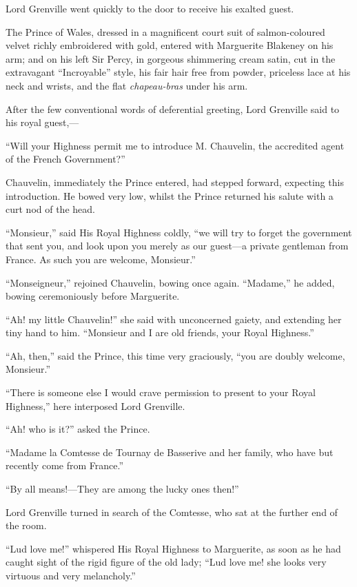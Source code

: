 Lord Grenville went quickly to the door to receive his exalted guest.

The Prince of Wales, dressed in a magnificent court suit of salmon-coloured velvet richly embroidered with gold, entered with Marguerite Blakeney on his arm; and on his left Sir Percy, in gorgeous shimmering cream satin, cut in the extravagant \enquote{Incroyable} style, his fair hair free from powder, priceless lace at his neck and wrists, and the flat \textit{chapeau-bras} under his arm.

After the few conventional words of deferential greeting, Lord Grenville said to his royal guest,---

\enquote{Will your Highness permit me to introduce M. Chauvelin, the accredited agent of the French Government?}

Chauvelin, immediately the Prince entered, had stepped forward, expecting this introduction. He bowed very low, whilst the Prince returned his salute with a curt nod of the head.

\enquote{Monsieur,} said His Royal Highness coldly, \enquote{we will try to forget the government that sent you, and look upon you merely as our guest---a private gentleman from France. As such you are welcome, Monsieur.}

\enquote{Monseigneur,} rejoined Chauvelin, bowing once again. \enquote{Madame,} he added, bowing ceremoniously before Marguerite.

\enquote{Ah! my little Chauvelin!} she said with unconcerned gaiety, and extending her tiny hand to him. \enquote{Monsieur and I are old friends, your Royal Highness.}

\enquote{Ah, then,} said the Prince, this time very graciously, \enquote{you are doubly welcome, Monsieur.}

\enquote{There is someone else I would crave permission to present to your Royal Highness,} here interposed Lord Grenville.

\enquote{Ah! who is it?} asked the Prince.

\enquote{Madame la Comtesse de Tournay de Basserive and her family, who have but recently come from France.}

\enquote{By all means!---They are among the lucky ones then!}

Lord Grenville turned in search of the Comtesse, who sat at the further end of the room.

\enquote{Lud love me!} whispered His Royal Highness to Marguerite, as soon as he had caught sight of the rigid figure of the old lady; \enquote{Lud love me! she looks very virtuous and very melancholy.}


